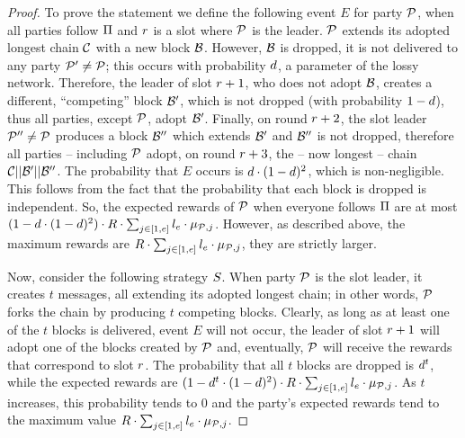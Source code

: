 \begin{proof}
    To prove the statement we define the following event $E$ for party
    $\mathcal{P}$, when all parties follow $\Pi$ and $r$ is a slot where
    $\mathcal{P}$ is the leader. $\mathcal{P}$ extends its adopted longest chain $\mathcal{C}$
    with a new block $\mathcal{B}$. However, $\mathcal{B}$ is dropped, \ie it is not
    delivered to any party $\mathcal{P}' \neq \mathcal{P}$; this occurs with probability
    $d$, a parameter of the lossy network. Therefore, the leader
    of slot $r+1$, who does not adopt $\mathcal{B}$, creates a different,
    ``competing'' block $\mathcal{B}'$, which is not dropped (with probability
    $1 - d$), thus all parties, except $\mathcal{P}$, adopt
    $\mathcal{B}'$. Finally, on round $r+2$, the slot leader $\mathcal{P}'' \neq
    \mathcal{P}$ produces a block $\mathcal{B}''$ which extends $\mathcal{B}'$ and $\mathcal{B}''$
    is not dropped, therefore all parties -- including $\mathcal{P}$ adopt, on round
    $r+3$, the -- now longest -- chain $\mathcal{C} || \mathcal{B}' || \mathcal{B}''$.
    The probability that $E$ occurs is $d \cdot (1 -
    d)^2$, which is non-negligible. This follows from the fact
    that the probability that each block is dropped is independent.
    So, the expected rewards of
    $\mathcal{P}$ when everyone follows $\Pi$ are at most
    $(1 - d \cdot (1 - d)^2) \cdot R \cdot \sum_{j \in [1, e]} l_e \cdot \mu_{\mathcal{P},j}$.
    However, as described above, the maximum rewards are
    $R \cdot \sum_{j \in [1, e]} l_e \cdot \mu_{\mathcal{P},j}$, \ie they are strictly larger.

    Now, consider the following strategy $S$. When party $\mathcal{P}$
    is the slot leader, it creates $t$ messages, all extending its
    adopted longest chain; in other words, $\mathcal{P}$ forks the chain by
    producing $t$ competing blocks. Clearly, as long as at least one of the $t$
    blocks is delivered, event $E$ will not occur, the leader of slot $r+1$
    will adopt one of the blocks created by $\mathcal{P}$ and, eventually, $\mathcal{P}$
    will receive the rewards that correspond to slot $r$. The probability
    that all $t$ blocks are dropped is $d^t$, while the expected rewards are
    $(1 - d^t \cdot (1 - d)^2) \cdot R \cdot \sum_{j \in [1, e]} l_e \cdot \mu_{\mathcal{P},j}$.
    As $t$ increases, this probability tends to $0$ and the party's expected
    rewards tend to the maximum value $R \cdot \sum_{j \in [1, e]}
    l_e \cdot \mu_{\mathcal{P},j}$.


\end{proof}
